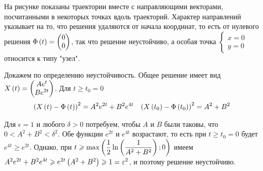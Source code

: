 \documentclass[a5paper,10pt]{article}
\begin{document}
На рисунке показаны траектории вместе с направляющими векторами, посчитанными в некоторых точках вдоль траекторий. Характер направлений указывает на то, что решения удаляются от начала координат, то есть от нулевого решения $\Phi\left(t\right) = \begin{pmatrix} 0 \\ 0 \end{pmatrix}$, так что решение неустойчиво, а особая точка $\left\{ \begin{matrix} x = 0 \\ y = 0 \end{matrix} \right.$ относится к типу "узел".

Докажем по определению неустойчивость. Общее решение имеет вид $X\left(t\right) = \begin{pmatrix} A e^{t} \\ B e^{2t} \end{pmatrix}$. Для $t \ge t_{0} = 0$
\begin{align*}
\left(X\left(t\right) - \Phi\left(t\right)\right)^2 = A^2 e^{2t} + B^2 e^{4t} &&
\left(X\left(t_{0}\right) - \Phi\left(t_{0}\right)\right)^2 = A^2 + B^2
\end{align*}

Для $\epsilon = 1$ и любого $\delta > 0$ потребуем, чтобы $A$ и $B$ были таковы, что $0 < A^2 + B^2 < \delta^2$. Обе функции $e^{2t}$ и $e^{4t}$ возрастают, то есть при $t \ge t_{0} = 0$ будет $e^{4t} \ge e^{2t}$. Однако, при
$t \geqslant \max\left( \dfrac {1} {2} \ln\left(\dfrac {1}{A^2 + B^2}\right); 0\right)$ имеем 
$A^2 e^{2t} + B^2 e^{4t} \geqslant e^{2t} \left(A^2 + B^2\right) \geqslant 1 = \varepsilon^2$, и поэтому \linebreak решение неустойчиво.
\end{document}
